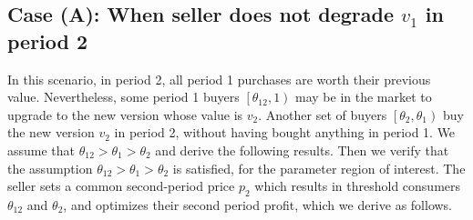\documentclass[isre,blindrev]{informs3} %
\begin{document}
\subsection{Case (A): When seller does not degrade \(v_1\) in period 2}
\label{innovate-no-degrade}

In this scenario, in period 2, all period 1 purchases are worth their previous value. Nevertheless, some { }period 1 buyers \(\left.\left[\theta
_{12},1\right.\right)\) may be in the market to upgrade to the new version whose value is \(v_2\). Another set of buyers \(\left.\left[\theta _2,\theta
_1\right.\right)\) buy the new version \(v_2\) in period 2, without having bought anything in period 1. We assume that \(\theta _{12}>\theta _1>\theta
_2\) and derive the following results. Then we verify that the assumption \(\theta _{12}>\theta _1>\theta _2\) is satisfied, for the parameter region
of interest. The seller sets a common second-period price \(p _{2}\) \citep{kornish_pricing_2001} which results in threshold consumers \(\theta _{12}\) and \(\theta _2\), and optimizes their second period profit, which we derive as follows.
\end{document}
